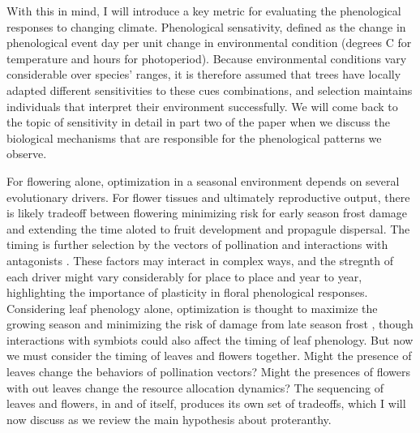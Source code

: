 \documentclass{article}\usepackage[]{graphicx}\usepackage[]{color}
\begin{document}
\par With this in mind, I will introduce a key metric for evaluating the phenological responses to changing climate. Phenological sensativity, defined as the change in phenological event day per unit change in environmental condition (degrees C for temperature and hours for photoperiod). Because environmental conditions vary considerable over species' ranges, it is therefore assumed that trees have locally adapted different sensitivities to these cues combinations, and selection maintains individuals that interpret their environment successfully. We will come back to the topic of sensitivity in detail in part two of the paper when we discuss the biological mechanisms that are responsible for the phenological patterns we observe.
\par For flowering alone, optimization in a seasonal environment depends on several evolutionary drivers. For flower tissues and ultimately reproductive output, there is likely tradeoff between flowering minimizing risk for early season frost damage and extending the time aloted to fruit development and propagule dispersal. The timing is further selection by the vectors of pollination and interactions with antagonists \citep{Austen2017}. These factors may interact in complex ways, and the stregnth of each driver might vary considerably for place to place and year to year, highlighting the importance of plasticity in floral phenological responses. Considering leaf phenology alone, optimization is thought to maximize the growing season and minimizing the risk of damage from late season frost \citep{Kramer1995}, though interactions with symbiots could also affect the timing of leaf phenology. 
But now we must consider the timing of leaves and flowers together. Might the presence of leaves change the behaviors of pollination vectors? Might the presences of flowers with out leaves change the resource allocation dynamics? The sequencing of leaves and flowers, in and of itself, produces its own set of tradeoffs, which I will now discuss as we review the main hypothesis about proteranthy.
\end{document}
